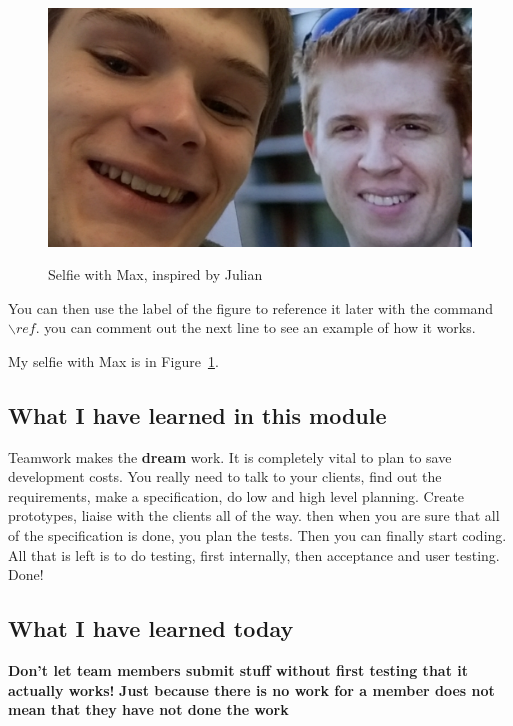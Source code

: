 \begin{figure}[h]
\caption{Selfie with Max, inspired by Julian}
\centering
\includegraphics[width=1.0\textwidth]{maxSelfieJoshua.jpg}
\label{fig:selfie}
\end{figure}

You can then use the label of the figure to reference it later with the command ${\backslash}ref$. you can comment out the next line to see an example of how it works.

My selfie with Max is in  Figure~\ref{fig:selfie}.

\subsection{What I have learned in this module}

Teamwork makes the \textbf{dream} work. It is completely vital to plan to save development costs. You really need to talk to your clients, find out the requirements, make a specification, do low and high level planning. Create prototypes, liaise with the clients all of the way. then when you are sure that all of the specification is done, you plan the tests. Then you can finally start coding. All that is left is to do testing, first internally, then acceptance and user testing. Done!

\subsection{What I have learned today}

\textbf{Don't let team members submit stuff without first testing that it actually works!}
\textbf{Just because there is no work for a member does not mean that they have not done the work}